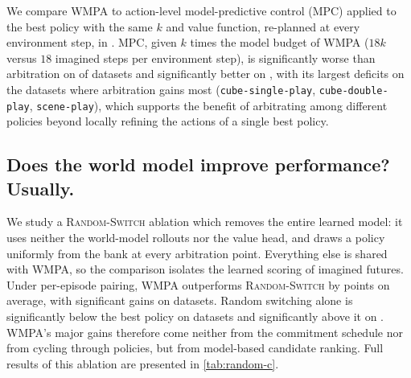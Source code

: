 \documentclass{article}
\theoremstyle{plain}
\theoremstyle{definition}
\theoremstyle{plain}
\newcommand{\wmpa}{\textsc{WMPA}}
\newcommand{\randomswitch}{\textsc{Random-Switch}}
\begin{document}
\begin{table}[t]
\caption{\textbf{Success rate (\%) on OGBench under the official protocol} ($5$ goals $\times$ $50$ episodes, $3$ bank seeds). We report every bank policy, the best policy for each dataset which is the bank policy with the highest three-seed mean success on the reported episodes, and \wmpa{}, which arbitrates over the same frozen policies with the $(k,c)$ setting of its task family (\cref{app:hyperparams}). Each entry is the mean success rate $\pm$ the half-width of its $95\%$ hierarchical-bootstrap interval (resampling bank seeds, then episodes), rounded to the nearest integer. Bold indicates values within $95\%$ of the row maximum.
}
\label{tab:main}
\centering
\scriptsize
\setlength{\tabcolsep}{3pt}
\resizebox{\linewidth}{!}{}
\end{table}

We compare \wmpa{} to action-level model-predictive control (MPC) applied to the best policy with the same $k$ and value function, re-planned at every environment step, in .
MPC, given $k$ times the model budget of \wmpa{} ($18k$ versus $18$ imagined steps per environment step), is significantly worse than arbitration on \AblNumDownPolicyMpc{} of \AblNumEnvsPolicyMpc{} datasets and significantly better on \AblNumUpPolicyMpc{}, with its largest deficits on the datasets where arbitration gains most (\texttt{cube-single-play}, \texttt{cube-double-play}, \texttt{scene-play}), which supports the benefit of arbitrating among different policies beyond locally refining the actions of a single best policy.

\subsection{Does the world model improve performance? Usually.}
\label{sec:ablation}

We study a \randomswitch{} ablation which removes the entire learned model: it uses neither the world-model rollouts nor the value head, and draws a policy uniformly from the bank at every arbitration point. Everything else is shared with \wmpa{}, so the comparison isolates the learned scoring of imagined futures. Under per-episode pairing, \wmpa{} outperforms \randomswitch{} by \MeanWMPPminusRandom{} points on average, with significant gains on \NumWMPPvsRandomSig{} datasets. Random switching alone is significantly below the best policy on \NumRandomSigDown{} datasets and significantly above it on \NumRandomSigUp{}. \wmpa{}'s major gains therefore come neither from the commitment schedule nor from cycling through policies, but from model-based candidate ranking. Full results of this ablation are presented in \cref{tab:random-c}.
\end{document}
